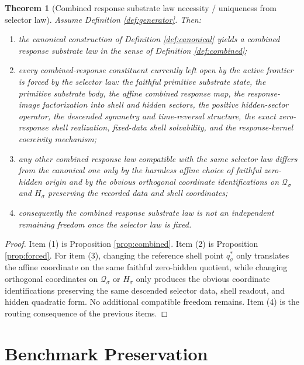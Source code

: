 \documentclass[11pt]{article}
\newcommand{\GapSpace}[1]{H_{#1}}
\newcommand{\CoreState}[1]{\mathcal Q_{#1}}
\newcommand{\ReferencePoint}[1]{q_{#1}^{\ast}}
\newtheorem{theorem}{Theorem}
\begin{document}
\begin{theorem}[Combined response substrate law necessity / uniqueness from selector law]
\label{thm:necessity}
Assume Definition \ref{def:generator}. Then:
\begin{enumerate}
    \item the canonical construction of Definition \ref{def:canonical} yields a combined response substrate law in the sense of Definition \ref{def:combined};
    \item every combined-response constituent currently left open by the active frontier is forced by the selector law: the faithful primitive substrate state, the primitive substrate body, the affine combined response map, the response-image factorization into shell and hidden sectors, the positive hidden-sector operator, the descended symmetry and time-reversal structure, the exact zero-response shell realization, fixed-data shell solvability, and the response-kernel coercivity mechanism;
    \item any other combined response law compatible with the same selector law differs from the canonical one only by the harmless affine choice of faithful zero-hidden origin and by the obvious orthogonal coordinate identifications on \(\CoreState{\sigma}\) and \(\GapSpace{\sigma}\) preserving the recorded data and shell coordinates;
    \item consequently the combined response substrate law is not an independent remaining freedom once the selector law is fixed.
\end{enumerate}
\end{theorem}

\begin{proof}
Item (1) is Proposition \ref{prop:combined}. Item (2) is Proposition \ref{prop:forced}. For item (3), changing the reference shell point \(\ReferencePoint{\sigma}\) only translates the affine coordinate on the same faithful zero-hidden quotient, while changing orthogonal coordinates on \(\CoreState{\sigma}\) or \(\GapSpace{\sigma}\) only produces the obvious coordinate identifications preserving the same descended selector data, shell readout, and hidden quadratic form. No additional compatible freedom remains. Item (4) is the routing consequence of the previous items.
\end{proof}

\section{Benchmark Preservation}
\end{document}
